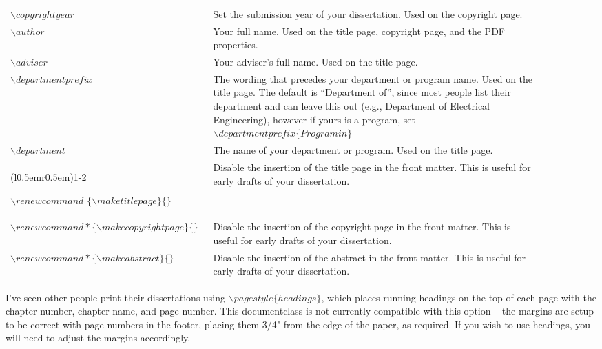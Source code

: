 \begin{longtable}{p{0.3\linewidth} p{0.6\linewidth}}
  $\backslash copyrightyear$ &
  Set the submission year of your dissertation. Used on the copyright page.
  \\

  $\backslash author$ &
  Your full name. Used on the title page, copyright page, and the PDF properties. \\

  $\backslash adviser$ &
  Your adviser's full name. Used on the title page. \\

  $\backslash departmentprefix$ &
  The wording that precedes your department or program name. Used on the title page. The default is ``Department of'', since most people list their department and can leave this out (e.g., Department of Electrical Engineering), however if yours is a program, set $\backslash departmentprefix\{Program in\}$ \\

  $\backslash department$ &
  The name of your department or program. Used on the title page. \\

  \cmidrule[0.1pt](l{0.5em}r{0.5em}){1-2}

  \raggedright
  $\backslash renewcommand$ $\{\backslash maketitlepage\}\{\}$ &
  Disable the insertion of the title page in the front matter. This is useful for early drafts of your dissertation. \\

  \raggedright  %
  $\backslash renewcommand*\{\backslash makecopyrightpage\}\{\}$ &
  Disable the insertion of the copyright page in the front matter. This is useful for early drafts of your dissertation. \\

  \raggedright
  $\backslash renewcommand*\{\backslash makeabstract\}\{\}$ &
  Disable the insertion of the abstract in the front matter. This is useful for early drafts of your dissertation. \\

\end{longtable}
\bodyspacing


I've seen other people print their dissertations using $\backslash pagestyle\{headings\}$, which places running headings on the top of each page with the chapter number, chapter name, and page number. This documentclass is not currently compatible with this option -- the margins are setup to be correct with page numbers in the footer, placing them 3/4" from the edge of the paper, as required. If you wish to use headings, you will need to adjust the margins accordingly.
